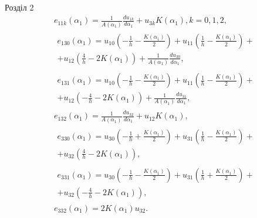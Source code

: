 \documentclass[8pt]{beamer}
\numberwithin{figure}{section}
\numberwithin{equation}{section}
\numberwithin{table}{section}
\begin{document}
\begin{frame}{Розділ 2}
\begin{equation}\label{eq:sqt_strain_l}
\begin{aligned}
&e_{11k}\left(\alpha_1\right)=\frac{1}{A\left(\alpha_1\right)}\frac{du_{1k}}{d\alpha_1}+u_{3k}K\left(\alpha_1\right), k=0,1,2,
\\
&\begin{split}
e_{130}\left(\alpha_1\right)=u_{10}\left( -\frac{1}{h}-\frac{K\left( \alpha_1 \right)}{2} \right)+u_{11}\left( \frac{1}{h}-\frac{K\left( \alpha_1 \right)}{2} \right)+ \\ +u_{12}\left( \frac{4}{h}-2K\left( \alpha_1 \right) \right) + \frac{1}{A\left(\alpha_1\right)}\frac{du_{30}}{d\alpha_1},
\end{split}\\
&\begin{split}
e_{131}\left(\alpha_1\right)=u_{10}\left( -\frac{1}{h}-\frac{K\left( \alpha_1 \right)}{2} \right)+u_{11}\left( \frac{1}{h}-\frac{K\left( \alpha_1 \right)}{2} \right)+\\+u_{12}\left( - \frac{4}{h}-2K\left( \alpha_1 \right) \right) + \frac{1}{A\left(\alpha_1\right)}\frac{du_{31}}{d\alpha_1},
\end{split}\\
&e_{132}\left(\alpha_1\right)=\frac{1}{A\left(\alpha_1\right)}\frac{du_{32}}{d\alpha_1}+u_{12}K\left(\alpha_1\right),\\
&\begin{split}
e_{330}\left(\alpha_1\right)=u_{30}\left( -\frac{1}{h}+\frac{K\left( \alpha_1 \right)}{2} \right)+u_{31}\left( \frac{1}{h}-\frac{K\left( \alpha_1 \right)}{2} \right)+\\+u_{32}\left( \frac{4}{h}-2K\left( \alpha_1 \right) \right),
\end{split}\\
&\begin{split}
e_{331}\left(\alpha_1\right)=u_{30}\left( -\frac{1}{h}-\frac{K\left( \alpha_1 \right)}{2} \right)+u_{31}\left( \frac{1}{h}+\frac{K\left( \alpha_1 \right)}{2} \right)+\\+u_{32}\left( -\frac{4}{h}-2K\left( \alpha_1 \right) \right),
\end{split}\\
&e_{332}\left(\alpha_1\right)=2K\left( \alpha_1 \right)u_{32}.
\end{aligned}
\end{equation}
\end{frame}
\end{document}
